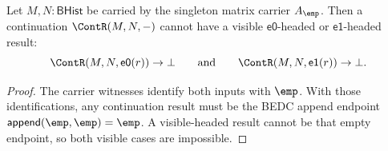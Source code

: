 \begin{theorem}
\label{thm:matrix-singleton-carrier-continuation-visible-result-absurd}
Let $M,N:\mathsf{BHist}$ be carried by the singleton matrix carrier
$A_{\emp}$. Then a continuation \(\ContR(M,N,-)\) cannot have a visible
\(\mathsf{e0}\)-headed or \(\mathsf{e1}\)-headed result:
$$
\ContR(M,N,\mathsf{e0}(r))\to\bot
\qquad\text{and}\qquad
\ContR(M,N,\mathsf{e1}(r))\to\bot.
$$
\end{theorem}
\begin{proof}
The carrier witnesses identify both inputs with \(\emp\). With those
identifications, any continuation result must be the BEDC append endpoint
\(\mathsf{append}(\emp,\emp)=\emp\). A visible-headed result cannot be that
empty endpoint, so both visible cases are impossible.
\end{proof}
